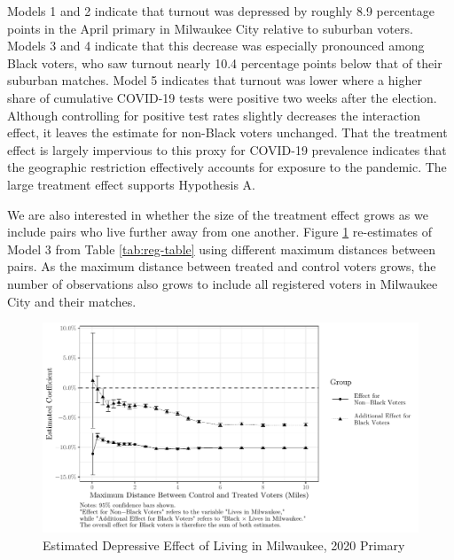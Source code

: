 \documentclass[
  12pt,
]{article}
\begin{document}
Models 1 and 2 indicate that turnout was depressed by roughly 8.9 percentage points in the April primary in Milwaukee City relative to suburban voters. Models 3 and 4 indicate that this decrease was especially pronounced among Black voters, who saw turnout nearly 10.4 percentage points below that of their suburban matches. Model 5 indicates that turnout was lower where a higher share of cumulative COVID-19 tests were positive two weeks after the election. Although controlling for positive test rates slightly decreases the interaction effect, it leaves the estimate for non-Black voters unchanged. That the treatment effect is largely impervious to this proxy for COVID-19 prevalence indicates that the geographic restriction effectively accounts for exposure to the pandemic. The large treatment effect supports Hypothesis A.

We are also interested in whether the size of the treatment effect grows as we include pairs who live further away from one another. Figure \ref{fig:coef-plot} re-estimates of Model 3 from Table \ref{tab:reg-table} using different maximum distances between pairs. As the maximum distance between treated and control voters grows, the number of observations also grows to include all registered voters in Milwaukee City and their matches.

\begin{figure}
\centering
\includegraphics{mke_turnout_files/figure-latex/plot-1.pdf}
\caption{\label{fig:plot}\label{fig:coef-plot}Estimated Depressive Effect of Living in Milwaukee, 2020 Primary}
\end{figure}
\end{document}
